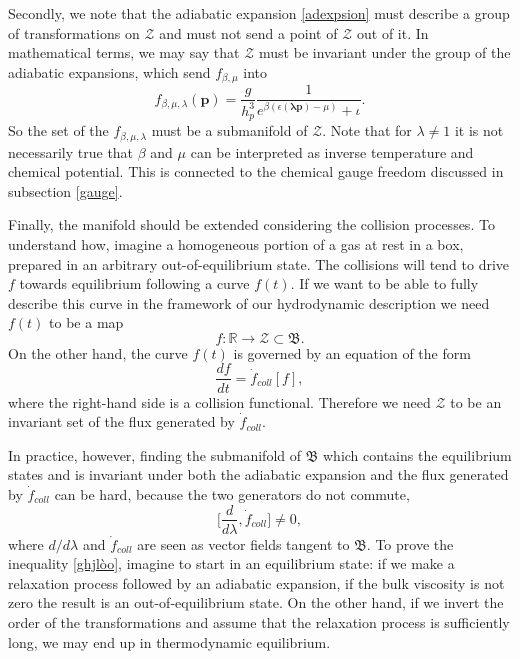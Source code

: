 \documentclass[useAMS,usenatbib,prd,twocolumn,nofootinbib]{revtex4-1}
\newcommand{\vect}[1]{\mathbf{{#1}}}
\begin{document}
Secondly, we note that the adiabatic expansion \eqref{adexpsion} must describe a group of transformations on $\mathcal{Z}$ and must not send a point of $\mathcal{Z}$ out of it. In mathematical terms, we may say that $\mathcal{Z}$ must be invariant under the group of the adiabatic expansions, which send $f_{\beta,\mu}$ into
\begin{equation}\label{lambdato}
f_{\beta,\mu,\lambda}(\vect{p}) =\dfrac{g}{h_p^3} \dfrac{1}{e^{\beta (\epsilon(\vect{\lambda p})-\mu)} + \iota}.
\end{equation}
So the set of the $f_{\beta,\mu,\lambda}$ must be a submanifold of $\mathcal{Z}$.  Note that for $\lambda \neq 1$ it is not necessarily true that $\beta$ and $\mu$ can be interpreted as inverse temperature and chemical potential. This is connected to the chemical gauge freedom discussed in subsection \ref{gauge}. 

Finally, the manifold should be extended considering the collision processes. To understand how, imagine a homogeneous portion of a gas at rest in a box, prepared in an arbitrary out-of-equilibrium state. The collisions will tend to drive $f$ towards equilibrium following a curve $f(t)$. If we want to be able to fully describe this curve in the framework of our hydrodynamic description we need $f(t)$ to be a map
\begin{equation}
f: \mathbb{R} \longrightarrow \mathcal{Z}\subset \mathfrak{B}.
\end{equation}  
On the other hand, the curve $f(t)$ is governed by an equation of the form
\begin{equation}
\dfrac{df}{dt} = \dot{f}_{coll}[f],
\end{equation}
where the right-hand side is a collision functional. Therefore we need $\mathcal{Z}$ to be an invariant set of the flux generated by $\dot{f}_{coll}$. 

In practice, however, finding the submanifold of $\mathfrak{B}$ which contains the equilibrium states and is invariant under both the adiabatic expansion and the flux generated by $\dot{f}_{coll}$ can be hard, because the two generators do not commute, 
\begin{equation}\label{ghjlòo}
\bigg[ \dfrac{d}{d\lambda} , \dot{f}_{coll} \bigg] \neq 0,
\end{equation}
where $d/d\lambda$ and $\dot{f}_{coll}$ are seen as vector fields tangent to $\mathfrak{B}$. To prove the inequality \eqref{ghjlòo}, imagine to start in an equilibrium state: if we make a relaxation process followed by an adiabatic expansion, if the bulk viscosity is not zero the result is an out-of-equilibrium state. On the other hand, if we invert the order of the transformations and assume that the relaxation process is sufficiently long, we may end up in thermodynamic equilibrium.
\end{document}
